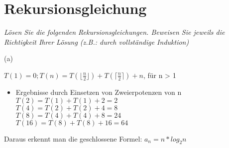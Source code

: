 										
\newcommand{\dozent}{Wolfgang Mulzer, Katharina Klost}					%
\newcommand{\tutor}{Tobias Gleißner}						%
\newcommand{\tutoriumNo}{02}				%
\newcommand{\ubungNo}{01}									%
\newcommand{\veranstaltung}{Algorithmen, Datenstrukturen und Datenabstraktion}	%
\newcommand{\semester}{Semester}						%
\newcommand{\studenten}{Nicolas Benjamin, Michael Wernitz}			%
\newcommand{\aufgNo}{3}	

\usepackage{amsmath}
\usepackage{mathtools}
\usepackage{letltxmacro}

							


\section{ Rekursionsgleichung \hfill}
{\itshape Lösen Sie die folgenden Rekursionsgleichungen. Beweisen Sie jeweils die Richtigkeit Ihrer Lösung (z.B.: durch vollständige Induktion)}

\begin{flushleft}
	(a)
\end{flushleft}

\begin{center}
$T(1) = 0; T(n) = T(\lfloor{\frac{n}{2}}\rfloor) + T(\lceil{\frac{n}{2}}\rceil) + n$, für n > 1 
\end{center}



\begin{itemize}
\item  Ergebnisse durch Einsetzen von Zweierpotenzen von n\\
	$T(2) = T(1) + T(1) + 2 = 2$ \\
    $T(4) = T(2) + T(2) + 4 = 8$ \\
    $T(8) = T(4) + T(4) + 8 = 24$ \\
    $T(16) = T(8) + T(8) + 16 = 64$ \\
\end{itemize}
 
Daraus erkennt man die geschlossene Formel: $a_{n} = n * log_{2}n$

